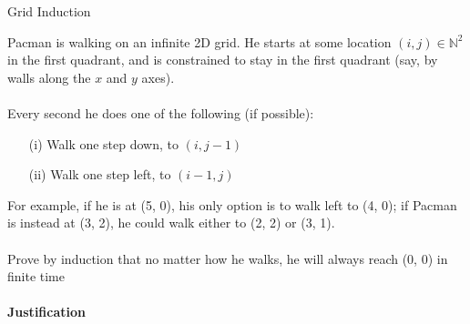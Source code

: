 \begin{homeworkProblem}{Grid Induction}

    Pacman is walking on an infinite 2D grid. He starts at some location $(i, j) \in \mathbb{N}^2$ in the first quadrant, and is constrained to stay in the first quadrant (say, by walls along the $x$ and $y$ axes). 
    \\ \\
    Every second he does one of the following (if possible):
    \begin{enumerate}
        \item[(i)] Walk one step down, to $(i, j-1)$
        \item[(ii)] Walk one step left, to $(i-1, j)$
    \end{enumerate}
    
    For example, if he is at (5, 0), his only option is to walk left to (4, 0); if Pacman is instead at (3, 2), he could walk either to (2, 2) or (3, 1).
    \\ \\
    Prove by induction that no matter how he walks, he will always reach (0, 0) in finite time
    \\ \\
    \textbf{Justification}


\end{homeworkProblem}
